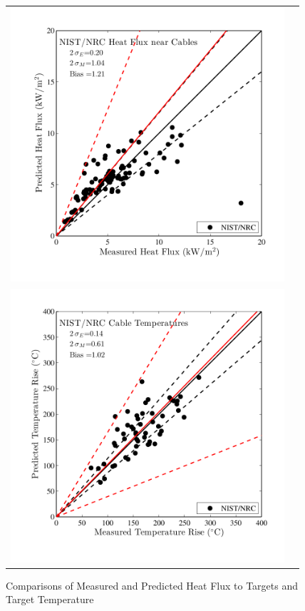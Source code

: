 \begin{figure}[p]
\begin{center}
\begin{tabular}{lr}
\includegraphics[width=4in]{FIGURES/ScatterPlots/Cable_Heat_Flux} &   \\
\includegraphics[width=4in]{FIGURES/ScatterPlots/Cable_Temperature} &  \\
\end{tabular}
\end{center}
\caption{Comparisons of Measured and Predicted Heat Flux to Targets and Target Temperature} \label{fig:Target_Scatter}
\end{figure}


